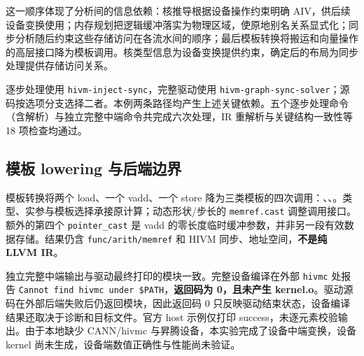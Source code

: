 这一顺序体现了分析间的信息依赖：核推导根据设备操作约束明确 AIV，供后续设备变换使用；内存规划把逻辑缓冲落实为物理区域，使原地别名关系显式化；同步分析随后约束这些存储访问在各流水间的顺序；最后模板转换将搬运和向量操作的高层接口降为模板调用。核类型信息为设备变换提供约束，确定后的布局为同步处理提供存储访问关系。

逐步处理使用 \texttt{hivm-inject-sync}，完整驱动使用 \texttt{hivm-graph-sync-solver}；源码按选项分支选择二者。本例两条路径均产生上述关键依赖。五个逐步处理命令（含解析）与独立完整中端命令共完成六次处理，IR 重解析与关键结构一致性等 18 项检查均通过。

\subsection{模板 lowering 与后端边界}
\label{subsec:template-backend}
模板转换将两个 load、一个 vadd、一个 store 降为三类模板的四次调用：、、。类型、实参与模板选择承接原计算；动态形状/步长的 \texttt{memref.cast} 调整调用接口。额外的第四个 \texttt{pointer\_cast} 是 vadd 的零长度临时缓冲参数，并非另一段有效数据存储。结果仍含 \texttt{func/arith/memref} 和 HIVM 同步、地址空间，\textbf{不是纯 LLVM IR}。

独立完整中端输出与驱动最终打印的模块一致。完整设备编译在外部 \texttt{hivmc} 处报告 \texttt{Cannot find hivmc under \$PATH}，\textbf{返回码为 0，且未产生 kernel.o}。驱动源码在外部后端失败后仍返回模块\cite{ascenddriver}，因此返回码 0 只反映驱动结束状态，设备编译结果还取决于诊断和目标文件。官方 host 示例仅打印 success，未逐元素校验输出。由于本地缺少 CANN/hivmc 与昇腾设备\cite{ascendfaq}，本实验完成了设备中端变换，设备 kernel 尚未生成，设备端数值正确性与性能尚未验证。

